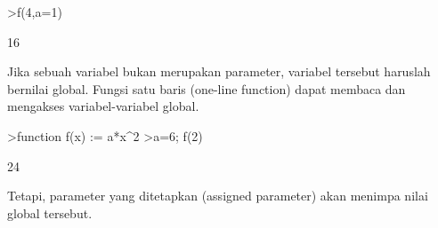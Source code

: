 \documentclass{article}
\newenvironment{eulernotebook}{\par}{\par}
\newenvironment{eulercomment}{\par\medskip}{\par\medskip}
\begin{document}
\begin{eulernotebook}
\begin{eulercomment}
\begin{eulercomment}
\begin{eulerprompt}
>f(4,a=1)
\end{eulerprompt}
\begin{euleroutput}
  16
\end{euleroutput}
\begin{eulercomment}
Jika sebuah variabel bukan merupakan parameter, variabel tersebut
haruslah bernilai global. Fungsi satu baris (one-line function) dapat
membaca dan mengakses variabel-variabel global.
\end{eulercomment}
\begin{eulerprompt}
>function f(x) := a*x^2
>a=6; f(2)
\end{eulerprompt}
\begin{euleroutput}
  24
\end{euleroutput}
\begin{eulercomment}
Tetapi, parameter yang ditetapkan (assigned parameter) akan menimpa
nilai global tersebut.


\end{eulercomment}
\end{eulercomment}
\end{eulercomment}
\end{eulernotebook}
\end{document}
